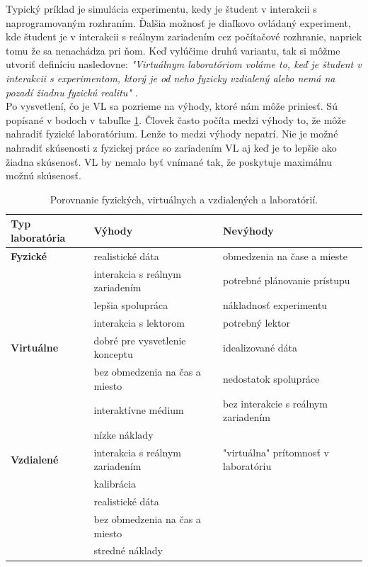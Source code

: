 Typický príklad je simulácia experimentu, kedy je študent v interakcii s naprogramovaným rozhraním. Ďalšia možnosť je diaľkovo ovládaný experiment, kde študent je v interakcii s reálnym zariadením cez počítačové rozhranie, napriek tomu že sa nenachádza pri ňom. 
Keď vylúčime druhú variantu, tak si môžme utvoriť definíciu nasledovne: \textit{"Virtuálnym laboratóriom voláme to, keď je študent v interakcii s experimentom, ktorý je od neho fyzicky vzdialený alebo nemá na pozadí žiadnu fyzickú realitu"} \cite{hatherly}.\\

Po vysvetlení, čo je VL sa pozrieme na výhody, ktoré nám môže priniesť. Sú popísané v bodoch v tabuľke \ref{table-real-remote-virtual-laboratory}.
Človek často počíta medzi výhody to, že môže nahradiť fyzické laboratórium. Lenže to medzi výhody nepatrí. Nie je možné nahradiť skúsenosti z fyzickej práce so zariadením VL aj keď je to lepšie ako žiadna skúsenosť. VL by nemalo byť vnímané tak, že poskytuje maximálnu možnú skúsenosť.\\

\begin{table}[H]
\small
\begin{tabular}{l l l}
\hline
\textbf{Typ laboratória} & \textbf{Výhody}  & \textbf{Nevýhody} \\ \hline
\textbf{Fyzické} & realistické dáta & obmedzenia na čase a mieste \\
& interakcia s reálnym zariadením & potrebné plánovanie prístupu\\
& lepšia spolupráca & nákladnosť experimentu \\
& interakcia s lektorom & potrebný lektor \\ \hline
\textbf{Virtuálne} & dobré pre vysvetlenie konceptu &  idealizované dáta\\
& bez obmedzenia na čas a miesto &  nedostatok spolupráce  \\
& interaktívne médium & bez interakcie s reálnym zariadením \\
& nízke náklady & \\ \hline
\textbf{Vzdialené} & interakcia s reálnym zariadením &  "virtuálna" prítomnosť v laboratóriu \\
& kalibrácia & \\
& realistické dáta & \\
& bez obmedzenia na čas a miesto & \\
& stredné náklady & \\ \hline
\end{tabular}
\caption{Porovnanie fyzických, virtuálnych a vzdialených a laboratórií.}
\label{table-real-remote-virtual-laboratory}
\end{table}

